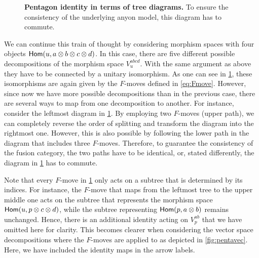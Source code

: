 \begin{figure}[t]
	\caption{\small \label{fig:PentagonId}\textbf{Pentagon identity in terms of tree diagrams.} To ensure the consistency of the underlying anyon model, this diagram has to commute.}
\end{figure}

We can continue this train of thought by considering morphism spaces with four objects $\mathsf{Hom}(u,a\otimes b\otimes c\otimes d)$. In this case, there are five different possible decompositions of the morphism space $V_u^{abcd}$. With the same argument as above they have to be connected by a unitary isomorphism. As one can see in \cref{fig:PentagonId}, these isomorphisms are again given by the $F$-moves defined in \cref{eq:Fmove}. However, since now we have more possible decompositions than in the previous case, there are several ways to map from one decomposition to another. For instance, consider the leftmost diagram in \cref{fig:PentagonId}. By employing two $F$-moves (upper path), we can completely reverse the order of splitting and transform the diagram into the rightmost one. However, this is also possible by following the lower path in the diagram that includes three $F$-moves. Therefore, to guarantee the consistency of the fusion category, the two paths have to be identical, or, stated differently, the diagram in \cref{fig:PentagonId} has to commute.

Note that every $F$-move in \cref{fig:PentagonId} only acts on a subtree that is determined by its indices. For instance, the $F$-move that maps from the leftmost tree to the upper middle one acts on the subtree that represents the morphism space $\mathsf{Hom}(u,p\otimes c\otimes d)$, while the subtree representing $\mathsf{Hom}(p,a\otimes b)$ remains unchanged. Hence, there is an additional identity acting on $V_p^{ab}$ that we have omitted here for clarity. This becomes clearer when considering the vector space decompositions where the $F$-moves are applied to as depicted in \cref{fig:pentavec}. Here, we have included the identity maps in the arrow labels. 

